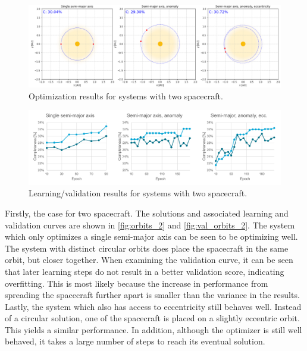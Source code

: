 \begin{figure}[htbp]
 \centering
 \includegraphics[width=1.0\textwidth]{img/orbits_2.png}
 \caption{Optimization results for systems with two spacecraft.}
 \label{fig:orbits_2}
\end{figure}
\begin{figure}[htbp]
 \centering
 \includegraphics[width=1.0\textwidth]{img/val_orbits_2.pdf}
 \caption{Learning/validation results for systems with two spacecraft.}
 \label{fig:val_orbits_2}
\end{figure}

Firstly, the case for two spacecraft. The solutions and associated learning and validation curves are shown in \autoref{fig:orbits_2} and \autoref{fig:val_orbits_2}. The system which only optimizes a single semi-major axis can be seen to be optimizing well. The system with distinct circular orbits does place the spacecraft in the same orbit, but closer together. When examining the validation curve, it can be seen that later learning steps do not result in a better validation score, indicating overfitting. This is most likely because the increase in performance from spreading the spacecraft further apart is smaller than the variance in the results. Lastly, the system which also has access to eccentricity still behaves well. Instead of a circular solution, one of the spacecraft is placed on a slightly eccentric orbit. This yields a similar performance. In addition, although the optimizer is still well behaved, it takes a large number of steps to reach its eventual solution. \\

